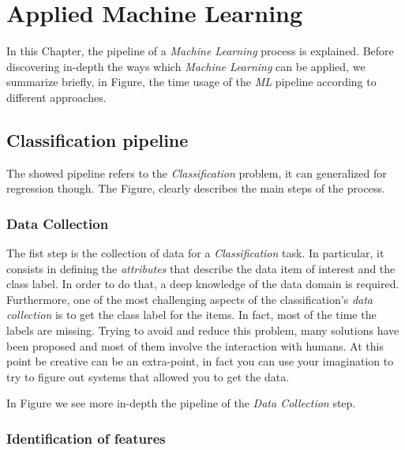

\section{Applied Machine Learning}

In this Chapter, the pipeline of a \emph{Machine Learning} process is explained. Before discovering in-depth the ways which \emph{Machine Learning} can be applied, we summarize briefly, in Figure, the time usage of the \emph{ML} pipeline according to different approaches.


\subsection{Classification pipeline}

The showed pipeline refers to the \emph{Classification} problem, it can generalized for regression though. The Figure, clearly describes the main steps of the process.


\subsubsection{Data Collection}

The fist step is the collection of data for a \emph{Classification} task. In particular, it consists in defining the \emph{attributes} that describe the data item of interest and the class label. In order to do that, a deep knowledge of the data domain is required. Furthermore, one of the most challenging aspects of the classification's \emph{data collection} is to get the class label for the items. In fact, most of the time the labels are missing. Trying to avoid and reduce this problem, many solutions have been proposed and most of them involve the interaction with humans. At this point be creative can be an extra-point, in fact you can use your imagination to try to figure out systems that allowed you to get the data.

In Figure we see more in-depth the pipeline of the \emph{Data Collection} step. 


\subsubsection*{Identification of features}

